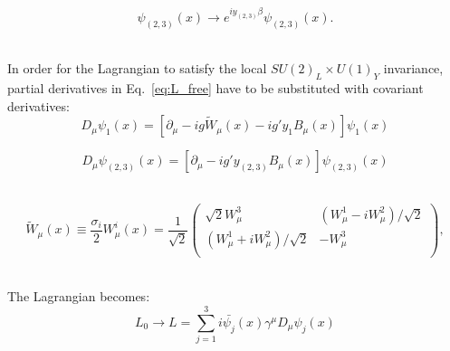 \begin{equation}\label{eq:psi23_transform}
\psi_{(2,3)}(x) \rightarrow e^{i y_{(2,3)} \beta} \psi_{(2,3)}(x).
\end{equation}

\\

In order for the Lagrangian to satisfy the local $SU(2)_L \times U(1)_Y$ invariance, partial derivatives in Eq.~\ref{eq:L_free} have to be substituted with covariant derivatives:\\

\begin{equation}
D_\mu \psi_1(x) = [\partial_\mu - i g {\tilde{W}}_\mu(x) - i g' y_1 B_\mu(x) ] \psi_1(x) 
\end{equation}

\begin{equation}
D_\mu \psi_{(2,3)}(x) = [\partial_\mu - i g' y_{(2,3)} B_\mu(x) ] \psi_{(2,3)}(x) 
\end{equation}

\\ 

\begin{equation}
  {\tilde{W}}_\mu(x) \equiv \frac{\sigma_i}{2} W_\mu^i(x) = \frac{1}{\sqrt{2}} 
  \begin{pmatrix}
  \sqrt{2} W_\mu^3 & (W_\mu^1 - i W_\mu^2)/{\sqrt{2}}\\
  (W_\mu^1 + i W_\mu^2)/{\sqrt{2}} & -W_\mu^3\\
  \end{pmatrix} , 
\end{equation}

\\

The Lagrangian becomes:\\

\begin{equation}\label{eq:L_free_covariant}
L_0 \rightarrow L = \sum_{j=1}^{3} i \bar{\psi_j}(x) \gamma^\mu D_\mu \psi_j(x) 
\end{equation}


